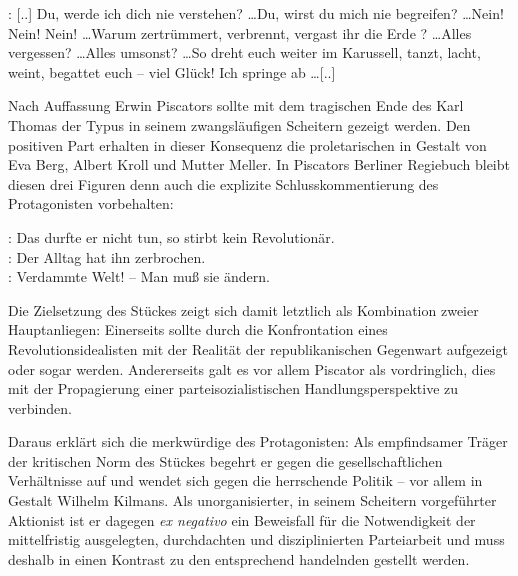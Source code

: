 \begin{BlockQuote}
: [..] Du, werde ich dich nie verstehen? \ldots Du,
wirst du mich nie begreifen?
\ldots Nein! Nein! Nein! \ldots Warum zertrümmert, verbrennt, vergast ihr die
Erde ? \ldots Alles vergessen? \ldots Alles umsonst? \ldots So dreht euch
weiter im Karussell, tanzt, lacht, weint, begattet euch -- viel Glück! Ich
springe ab \ldots [..] 
\end{BlockQuote}
Nach Auffassung Erwin Piscators sollte mit dem tragischen Ende des
\Cite{klassenmäßig entwurzelten} Karl Thomas der \Cite{anarchisch
  sentimentale} Typus in seinem zwangsläufigen Scheitern gezeigt werden. Den
positiven Part erhalten in dieser Konsequenz die \Cite{klassenbewussten}
proletarischen \Cite{Gegenspieler} in Gestalt von Eva Berg, Albert Kroll und
Mutter Meller.
In Piscators Berliner Regiebuch bleibt diesen drei Figuren denn
auch die explizite Schlusskommentierung des Protagonisten vorbehalten:

\begin{BlockQuote}
: Das durfte er nicht tun, so stirbt kein Revolutionär.\\
: Der Alltag hat ihn zerbrochen.\\
: Verdammte Welt! -- Man muß sie
ändern. 
\end{BlockQuote}
Die Zielsetzung des Stückes zeigt sich damit letztlich als Kombination zweier
Hauptanliegen: Einerseits sollte \Cite{der Irrsinn der bürgerlichen
  Weltordnung} durch die Konfrontation eines 
Revolutionsidealisten mit der Realität der republikanischen Gegenwart
aufgezeigt oder sogar \Cite{bewiesen} werden.
Andererseits galt es vor allem Piscator als vordringlich, dies mit der
Propagierung einer parteisozialistischen Handlungsperspektive zu verbinden.

Daraus erklärt sich die merkwürdige  des
Protagonisten: Als empfindsamer Träger der kritischen Norm des Stückes begehrt
er gegen die  gesellschaftlichen Verhältnisse auf und wendet sich
gegen die
herrschende Politik -- vor allem in Gestalt Wilhelm Kilmans. Als unorganisierter, in
seinem Scheitern vorgeführter  Aktionist ist er dagegen \emph{ex negativo} ein
Beweisfall für die Notwendigkeit der mittelfristig ausgelegten, durchdachten und
disziplinierten Parteiarbeit und muss deshalb in einen
Kontrast zu den entsprechend handelnden \Cite{Genossen} gestellt werden. 


